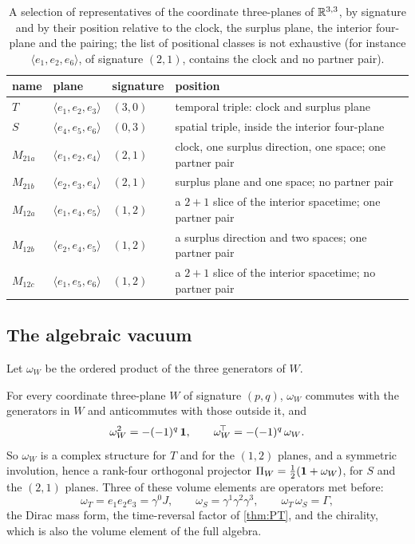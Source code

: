 \begin{table}[t]
\centering
\small
\begin{tabular}{@{}llll@{}}
\toprule
name & plane & signature & position\\
\midrule
$T$ & $\langle e_1,e_2,e_3\rangle$ & $(3,0)$ & temporal triple: clock and surplus plane\\
$S$ & $\langle e_4,e_5,e_6\rangle$ & $(0,3)$ & spatial triple, inside the interior four-plane\\
$M_{21a}$ & $\langle e_1,e_2,e_4\rangle$ & $(2,1)$ & clock, one surplus direction, one space; one partner pair\\
$M_{21b}$ & $\langle e_2,e_3,e_4\rangle$ & $(2,1)$ & surplus plane and one space; no partner pair\\
$M_{12a}$ & $\langle e_1,e_4,e_5\rangle$ & $(1,2)$ & a $2{+}1$ slice of the interior spacetime; one partner pair\\
$M_{12b}$ & $\langle e_2,e_4,e_5\rangle$ & $(1,2)$ & a surplus direction and two spaces; one partner pair\\
$M_{12c}$ & $\langle e_1,e_5,e_6\rangle$ & $(1,2)$ & a $2{+}1$ slice of the interior spacetime; no partner pair\\
\bottomrule
\end{tabular}
\caption{A selection of representatives of the coordinate three-planes of $\mathbb{R}^{3,3}$, by signature and by their position relative to the
clock, the surplus plane, the interior four-plane and the pairing; the list of positional classes is not exhaustive (for instance $\langle e_1,e_2,e_6\rangle$,
of signature $(2,1)$, contains the clock and no partner pair).}
\label{tab:subfields}
\end{table}

\subsection{The algebraic vacuum}

Let $\omega_W$ be the ordered product of the three generators of $W$.

\begin{theorem}
\label{thm:subdichotomy}
For every coordinate three-plane $W$ of signature $(p,q)$, $\omega_W$ commutes with the generators in $W$ and anticommutes with those outside it, and
\[
\omega_W^2=-(-1)^q\,\mathbf 1,\qquad \omega_W^{\!\top}=-(-1)^q\,\omega_W .
\]
So $\omega_W$ is a complex structure for $T$ and for the $(1,2)$ planes, and a symmetric involution, hence a rank-four orthogonal projector
$\Pi_W=\tfrac12(\mathbf 1+\omega_W)$, for $S$ and the $(2,1)$ planes. Three of these volume elements are operators met before:
\[
\omega_T=e_1e_2e_3=\gamma^0J,\qquad \omega_S=\gamma^1\gamma^2\gamma^3,\qquad \omega_T\,\omega_S=\Gamma ,
\]
the Dirac mass form, the time-reversal factor of \cref{thm:PT}, and the chirality, which is also the volume element of the full algebra.
\end{theorem}

